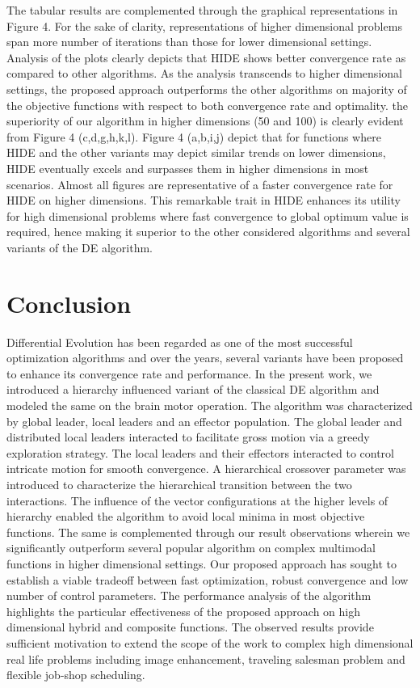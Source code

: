 \documentclass[a4paper,twoside]{article}
\begin{document}
The tabular results are complemented through the graphical representations in Figure 4. For the sake of clarity, representations of higher dimensional problems span more number of iterations than those for lower dimensional settings. Analysis of the plots clearly depicts that HIDE shows better convergence rate as compared to other algorithms. As the analysis transcends to higher dimensional settings, the proposed approach outperforms the other algorithms on majority of the objective functions with respect to both convergence rate and optimality. the superiority of our algorithm in higher dimensions (50 and 100) is clearly evident from Figure 4 (c,d,g,h,k,l). Figure 4 (a,b,i,j) depict that for functions where HIDE and the other variants may depict similar trends on lower dimensions, HIDE eventually excels and surpasses them in higher dimensions in most scenarios. Almost all figures are representative of a faster convergence rate for HIDE on higher dimensions. This remarkable trait in HIDE enhances its utility for high dimensional problems where fast convergence to global optimum value is required, hence making it superior to the other considered algorithms and several variants of the DE algorithm.

\section{Conclusion}
Differential Evolution has been regarded as one of the most successful optimization algorithms and over the years, several variants have been proposed to enhance its convergence rate and performance. In the present work, we introduced a hierarchy influenced variant of the classical DE algorithm and modeled the same on the brain motor operation. The algorithm was characterized by global leader, local leaders and an effector population. The global leader and distributed local leaders interacted to facilitate gross motion via a greedy exploration strategy. The local leaders and their effectors interacted to control intricate motion for smooth convergence. A hierarchical crossover parameter was introduced to characterize the hierarchical transition between the two interactions. The influence of the vector configurations at the higher levels of hierarchy enabled the algorithm to avoid local minima in most objective functions. The same is complemented through our result observations wherein we significantly outperform several popular algorithm on complex multimodal functions in higher dimensional settings.
Our proposed approach has sought to establish a viable tradeoff between fast optimization, robust convergence and low number of control parameters.
The performance analysis of the algorithm highlights the particular effectiveness of the proposed approach on high dimensional hybrid and composite functions. The observed results provide sufficient motivation to extend the scope of the work to complex high dimensional real life problems including image enhancement, traveling salesman problem and flexible job-shop scheduling.
\end{document}
